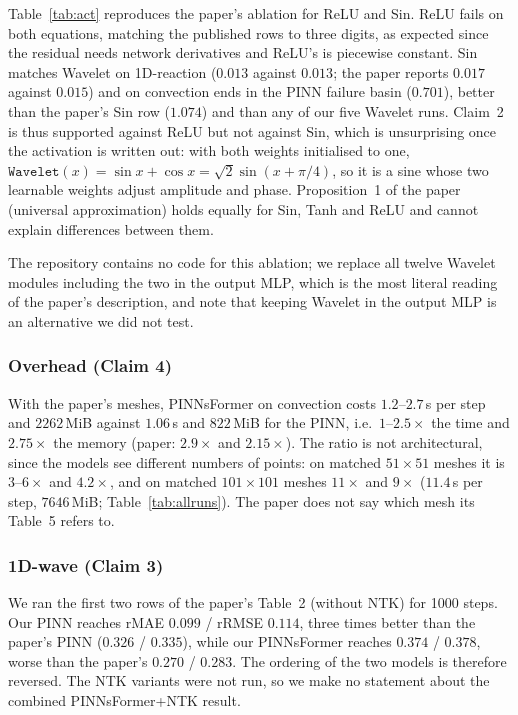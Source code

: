 \documentclass[10pt]{article} %
\begin{document}
Table~\ref{tab:act} reproduces the paper's ablation for ReLU and Sin. ReLU fails on both equations, matching the published rows to three digits, as expected since the residual needs network derivatives and ReLU's is piecewise constant. Sin matches Wavelet on 1D-reaction ($0.013$ against $0.013$; the paper reports $0.017$ against $0.015$) and on convection ends in the PINN failure basin ($0.701$), better than the paper's Sin row ($1.074$) and than any of our five Wavelet runs. Claim~2 is thus supported against ReLU but not against Sin, which is unsurprising once the activation is written out: with both weights initialised to one, $\texttt{Wavelet}(x)=\sin x+\cos x=\sqrt{2}\sin(x+\pi/4)$, so it is a sine whose two learnable weights adjust amplitude and phase. Proposition~1 of the paper (universal approximation) holds equally for Sin, Tanh and ReLU and cannot explain differences between them.

The repository contains no code for this ablation; we replace all twelve Wavelet modules including the two in the output MLP, which is the most literal reading of the paper's description, and note that keeping Wavelet in the output MLP is an alternative we did not test.

\subsubsection{Overhead (Claim 4)}
With the paper's meshes, PINNsFormer on convection costs $1.2$--$2.7$\,s per step and $2262$\,MiB against $1.06$\,s and $822$\,MiB for the PINN, i.e.\ $1$--$2.5\times$ the time and $2.75\times$ the memory (paper: $2.9\times$ and $2.15\times$). The ratio is not architectural, since the models see different numbers of points: on matched $51\times51$ meshes it is $3$--$6\times$ and $4.2\times$, and on matched $101\times101$ meshes $11\times$ and $9\times$ ($11.4$\,s per step, $7646$\,MiB; Table~\ref{tab:allruns}). The paper does not say which mesh its Table~5 refers to.

\subsubsection{1D-wave (Claim 3)}
We ran the first two rows of the paper's Table~2 (without NTK) for 1000 steps. Our PINN reaches rMAE $0.099$ / rRMSE $0.114$, three times better than the paper's PINN ($0.326$ / $0.335$), while our PINNsFormer reaches $0.374$ / $0.378$, worse than the paper's $0.270$ / $0.283$. The ordering of the two models is therefore reversed. The NTK variants were not run, so we make no statement about the combined PINNsFormer+NTK result.
\end{document}

